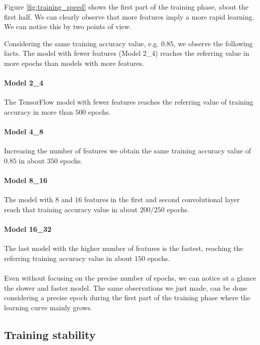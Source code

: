 Figure \ref{fig:training_speed} shows the first part of the training phase, about the first half. We can clearly observe that more features imply a more rapid learning. We can notice this by two points of view.

Considering the same training accuracy value, e.g. $0.85$, we observe the following facts. The model with fewer features (Model 2\_4) reaches the referring value in more epochs than models with more features.

\paragraph{Model 2\_4}

The TensorFlow model with fewer features reaches the referring value of training accuracy in more than $500$ epochs.

\paragraph{Model 4\_8}

Increasing the number of features we obtain the same training accuracy value of $0.85$ in about $350$ epochs.

\paragraph{Model 8\_16}

The model with $8$ and $16$ features in the first and second convolutional layer reach that training accuracy value in about $200/250$ epochs.

\paragraph{Model 16\_32}

The last model with the higher number of features is the fastest, reaching the referring training accuracy value in about $150$ epochs.
\\
\\
Even without focusing on the precise number of epochs, we can notice at a glance the slower and faster model. The same observations we just made, can be done considering a precise epoch during the first part of the training phase where the learning curve mainly grows.

\subsection{Training stability}

